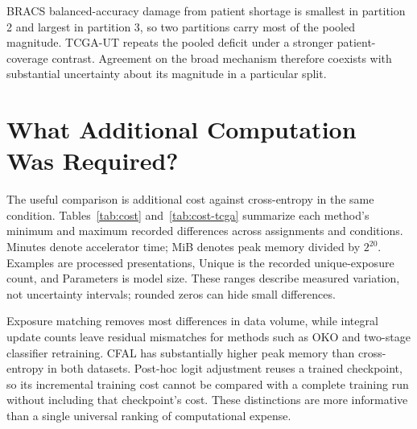 \noindent BRACS balanced-accuracy damage from patient shortage is smallest in partition 2 and largest in partition 3, so two partitions carry most of the pooled magnitude. TCGA-UT repeats the pooled deficit under a stronger patient-coverage contrast. Agreement on the broad mechanism therefore coexists with substantial uncertainty about its magnitude in a particular split.

\section{What Additional Computation Was Required?}
\label{app:cost}
The useful comparison is additional cost against cross-entropy in the same condition. Tables~\ref{tab:cost} and~\ref{tab:cost-tcga} summarize each method's minimum and maximum recorded differences across assignments and conditions. Minutes denote accelerator time; MiB denotes peak memory divided by $2^{20}$. Examples are processed presentations, Unique is the recorded unique-exposure count, and Parameters is model size. These ranges describe measured variation, not uncertainty intervals; rounded zeros can hide small differences.

\begin{table}[H]
\centering\footnotesize\setlength{\tabcolsep}{3pt}

\caption{BRACS additional cost against matched cross-entropy. Post-hoc adjustment records incremental work after checkpoint reuse; its negative training counts are not end-to-end savings.}
\label{tab:cost}
\end{table}
\begin{table}[H]
\centering\footnotesize\setlength{\tabcolsep}{3pt}

\caption{TCGA-UT additional cost, with the same units and aggregation as Table~\ref{tab:cost}. Exposure differences and memory overhead vary by mechanism.}
\label{tab:cost-tcga}
\end{table}

\noindent Exposure matching removes most differences in data volume, while integral update counts leave residual mismatches for methods such as OKO and two-stage classifier retraining. CFAL has substantially higher peak memory than cross-entropy in both datasets. Post-hoc logit adjustment reuses a trained checkpoint, so its incremental training cost cannot be compared with a complete training run without including that checkpoint's cost. These distinctions are more informative than a single universal ranking of computational expense.
